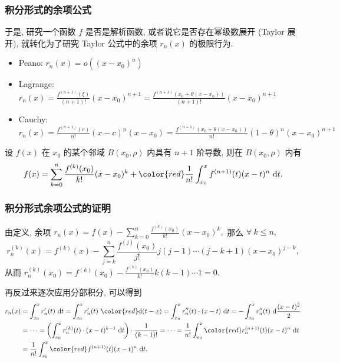 
\begin{frame}
\frametitle{积分形式的余项公式}

于是, 研究一个函数 $f$ 是否是解析函数, 或者说它是否存在幂级数展开 (Taylor 展开), 就转化为了研究 Taylor 公式中的余项 $r_n(x)$ 的极限行为.

\begin{recall}[各种形式的余项公式]
\begin{itemize}
\item Peano: $r_n(x) = o((x - x_0)^n)$
\item Lagrange: $r_n(x) = \frac{f^{(n+1)}(\xi)}{(n+1)!} (x - x_0)^{n+1} = \frac{f^{(n+1)}(x_0 + \theta (x - x_0))}{(n+1)!} (x - x_0)^{n+1}$
\item Cauchy: $r_n(x) = \frac{f^{(n+1)}(c)}{n!} (x - c)^n (x - x_0) = \frac{f^{(n+1)}(x_0 + \theta (x - x_0))}{n!} (1 - \theta)^n (x - x_0)^{n+1}$
\end{itemize}
\end{recall}

\pause
\vspace{0.5em}

\begin{Def}[积分形式的余项公式]
设 $f(x)$ 在 $x_0$ 的某个邻域 $B(x_0, \rho)$ 内具有 $n + 1$ 阶导数, 则在 $B(x_0, \rho)$ 内有
\[
f(x) = \sum_{k=0}^n \frac{f^{(k)}(x_0)}{k!} (x - x_0)^k + {\color{red} \frac{1}{n!} \int_{x_0}^x f^{(n+1)}(t) (x - t)^n ~ \mathrm{d}t}.
\]
\end{Def}

\end{frame}


\begin{frame}
\frametitle{积分形式余项公式的证明}

由定义, 余项 $r_n(x) = f(x) - \sum_{k=0}^n \frac{f^{(k)}(x_0)}{k!} (x - x_0)^k,$ 那么 $\forall ~ k \leqslant n,$
\[
r_n^{(k)}(x) = f^{(k)}(x) - \sum_{j=k}^n \frac{f^{(j)}(x_0)}{j!} j (j-1) \cdots (j-k+1) (x - x_0)^{j-k},
\]
从而 $r_n^{(k)}(x_0) = f^{(k)}(x_0) - \frac{f^{(k)}(x_0)}{k!} k (k-1) \cdots 1 = 0.$

\pause
\vspace{0.5em}

再反过来逐次应用分部积分, 可以得到
\begin{align*}
r_n(x) & = \int_{x_0}^x r_n'(t) ~ \mathrm{d}t = \int_{x_0}^x r_n'(t) ~ {\color{red} \mathrm{d} (t-x)} = \int_{x_0}^x r_n''(t) \cdot (x - t) ~ \mathrm{d}t = - \int_{x_0}^x r_n''(t) ~ \mathrm{d} \frac{(x - t)^2}{2} \\
& = \cdots = \left( \int_{x_0}^x r_n^{(k)}(t) \cdot (x - t)^{k-1} ~ \mathrm{d} t \right) \cdot \frac{1}{(k-1)!} = \cdots = \frac{1}{n!} \int_{x_0}^x {\color{red} r_n^{(n+1)}(t)} (x - t)^n ~ \mathrm{d}t \\
& = \frac{1}{n!} \int_{x_0}^x {\color{red} f^{(n+1)}(t)} (x - t)^n ~ \mathrm{d}t.
\end{align*}

\end{frame}

